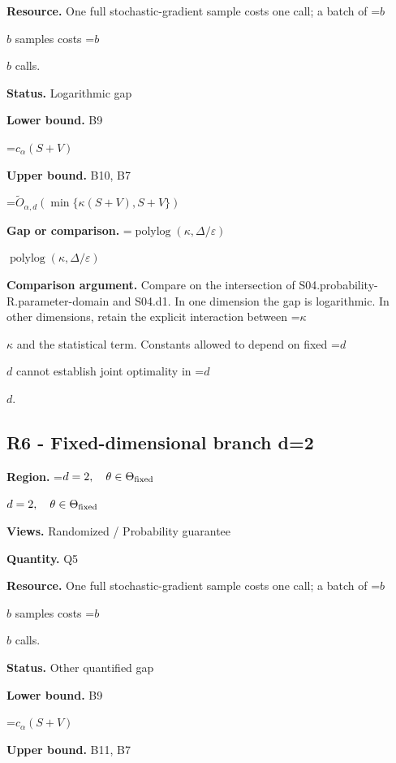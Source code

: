 \documentclass[10pt,a4paper]{article}
\newcommand{\AtlasMath}[1]{\par\begingroup\centering\setbox0=\hbox{$\displaystyle #1$}\ifdim\wd0>1.4\linewidth\typeout{ATLAS WIDE FORMULA: \the\wd0}\fi\ifdim\wd0>\linewidth\resizebox{\linewidth}{!}{\box0}\else\box0\fi\par\endgroup}
\newcommand{\AtlasInlineMath}[1]{\begingroup\setbox0=\hbox{$#1$}\ifdim\wd0>.4\linewidth\endgroup\AtlasMath{#1}\else\endgroup$#1$\fi}
\begin{document}
\textbf{Resource.} One full stochastic-gradient sample costs one call; a batch of \AtlasInlineMath{b} samples costs \AtlasInlineMath{b} calls.



\textbf{Status.} Logarithmic gap



\textbf{Lower bound.} B9



\AtlasMath{c_\alpha(S+V)}


\textbf{Upper bound.} B10, B7



\AtlasMath{\widetilde{O}_{\alpha,d}(\min\{\kappa(S+V),S+V\})}


\textbf{Gap or comparison.} \AtlasInlineMath{\operatorname{polylog}(\kappa,\Delta/\varepsilon)}



\textbf{Comparison argument.} Compare on the intersection of S04.probability-R.parameter-domain and S04.d1. In one dimension the gap is logarithmic. In other dimensions, retain the explicit interaction between \AtlasInlineMath{\kappa} and the statistical term. Constants allowed to depend on fixed \AtlasInlineMath{d} cannot establish joint optimality in \AtlasInlineMath{d}.



\subsection{R6 - Fixed-dimensional branch d=2}


\textbf{Region.} \AtlasInlineMath{d=2,\quad\theta\in\Theta_{\rm fixed}}



\textbf{Views.} Randomized / Probability guarantee



\textbf{Quantity.} Q5



\textbf{Resource.} One full stochastic-gradient sample costs one call; a batch of \AtlasInlineMath{b} samples costs \AtlasInlineMath{b} calls.



\textbf{Status.} Other quantified gap



\textbf{Lower bound.} B9



\AtlasMath{c_\alpha(S+V)}


\textbf{Upper bound.} B11, B7
\end{document}
